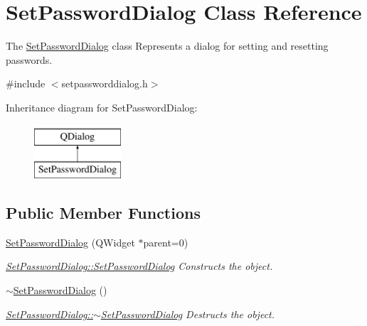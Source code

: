 \hypertarget{class_set_password_dialog}{}\section{Set\+Password\+Dialog Class Reference}
\label{class_set_password_dialog}


The \hyperlink{class_set_password_dialog}{Set\+Password\+Dialog} class Represents a dialog for setting and resetting passwords.  




{\ttfamily \#include $<$setpassworddialog.\+h$>$}

Inheritance diagram for Set\+Password\+Dialog\+:\begin{figure}[H]
\begin{center}
\leavevmode
\includegraphics[height=2.000000cm]{class_set_password_dialog}
\end{center}
\end{figure}
\subsection*{Public Member Functions}
\begin{DoxyCompactItemize}
\item 
\hyperlink{class_set_password_dialog_a6c0f4e419cde5431401dd4deeccb1a54}{Set\+Password\+Dialog} (Q\+Widget $\ast$parent=0)
\begin{DoxyCompactList}\small\item\em \hyperlink{class_set_password_dialog_a6c0f4e419cde5431401dd4deeccb1a54}{Set\+Password\+Dialog\+::\+Set\+Password\+Dialog} Constructs the object. \end{DoxyCompactList}\item 
\hyperlink{class_set_password_dialog_ae3dec5f6c8b27800757c928e7e61468c}{$\sim$\+Set\+Password\+Dialog} ()
\begin{DoxyCompactList}\small\item\em \hyperlink{class_set_password_dialog_ae3dec5f6c8b27800757c928e7e61468c}{Set\+Password\+Dialog\+::$\sim$\+Set\+Password\+Dialog} Destructs the object. \end{DoxyCompactList}\end{DoxyCompactItemize}


